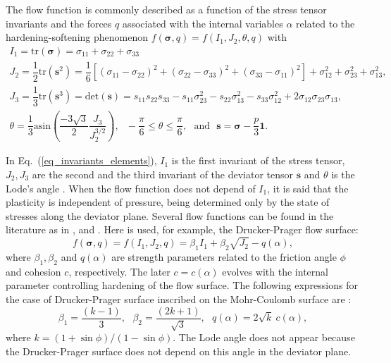 \documentclass[Journal,letterpaper]{ascelike-new}
\newcommand{\onell}{\boldsymbol{1}}
\newcommand{\sll}{\boldsymbol{s}}
\newcommand{\stress}{\boldsymbol{\sigma}}
\begin{document}
The flow function is commonly described as a function of the stress tensor invariants and the forces $q$ associated with the internal variables $\alpha$ related to the hardening-softening phenomenon $f(\stress,q) = f(I_1,J_2,\theta,q)$ with
\begin{equation} \label{eq_invariants_elements}
	\begin{array}{lcl}
		I_1 = \text{tr}(\stress) = \sigma_{11}+\sigma_{22}+\sigma_{33}\\
		J_2 = \dfrac{1}{2}\text{tr}(\sll^2) = \dfrac{1}{6}\left[ (\sigma_{11}-\sigma_{22})^2 + (\sigma_{22}-\sigma_{33})^2 + (\sigma_{33}-\sigma_{11})^2 \right] + \sigma_{12}^2+ \sigma_{23}^2+ \sigma_{13}^2, \\
		J_3 = \dfrac{1}{3}\text{tr}(\sll^3) = \text{det}(\sll) = s_{11}s_{22}s_{33}-s_{11}\sigma_{23}^2-s_{22}\sigma_{13}^2-s_{33}\sigma_{12}^2+2\sigma_{12}\sigma_{23}\sigma_{13}, \\ 
		\theta = \dfrac{1}{3}\text{asin}\left( \dfrac{-3\sqrt{3}}{2} \dfrac{J_3}{J_2^{3/2}} \right),~~~
		-\dfrac{\pi}{6} \le \theta \le \dfrac{\pi}{6},~~~\text{and}~~~\sll = \stress - \dfrac{p}{3}\onell.
	\end{array}\;
\end{equation}

In Eq.~(\ref{eq_invariants_elements}), $I_1$ is the first invariant of the stress tensor, $J_2,J_3$ are the second and the third invariant of the deviator tensor $\sll$ and $\theta$ is the Lode's angle \cite{chen1988}. When the flow function does not depend of $I_1$, it is said that the plasticity is independent of pressure, being determined only by the state of stresses along the deviator plane. Several flow functions can be found in the literature as in ,  and . Here is used, for example, the Drucker-Prager flow surface:
\begin{equation}
	\label{eq:f_Drucker_Prager}
	f(\stress,q) = f(I_1,J_2,q) = \beta_1 I_1 +\beta_2 \sqrt{J_2}-q(\alpha),
\end{equation}
where $\beta_1, \beta_2$ and $q(\alpha)$ are strength parameters related to the friction angle $\phi$ and cohesion $c$, respectively. The later $c=c(\alpha)$ evolves with the internal parameter controlling hardening of the flow surface. The following expressions for the case of Drucker-Prager surface inscribed on the Mohr-Coulomb surface are \cite{bernaud1991}:
\begin{equation}
	\label{eq:f_DP_inscrita_MC}
	\beta_1 = \dfrac{(k-1)}{3}, ~~~ \beta_2 = \dfrac{(2k+1)}{\sqrt{3}}, ~~~
	q(\alpha) = 2\sqrt{k}~c(\alpha),
\end{equation}
where $k = (1+\sin{\phi})/(1-\sin{\phi})$. The Lode angle does not appear because the Drucker-Prager surface does not depend on this angle in the deviator plane.
\end{document}
